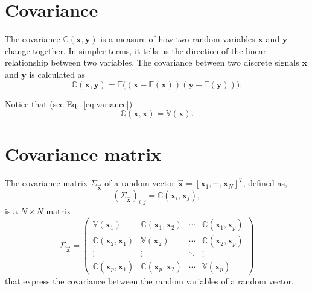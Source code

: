 
\section{Covariance}
\label{sec:covariance}

The covariance $\mathbb{C}(\mathbf{x}, \mathbf{y})$ is a measure of
how two random variables $\mathbf{x}$ and $\mathbf{y}$ change
together. In simpler terms, it tells us the direction of the linear
relationship between two variables. The covariance between two
discrete signals $\mathbf{x}$ and $\mathbf{y}$ is calculated as
\begin{equation}
  \mathbb{C}(\textbf{x}, \textbf{y}) = \mathbb{E}\big((\mathbf{x}-\mathbb{E}(\mathbf{x}))(\mathbf{y}-\mathbb{E}(\mathbf{y}))\big).
\end{equation}

Notice that (see Eq.~\ref{eq:variance})
\begin{equation}
  \mathbb{C}(\mathbf{x}, \mathbf{x}) = \mathbb{V}(\mathbf{x}).
\end{equation}


\section{Covariance matrix}
\label{sec:covariance_matrix}

The covariance matrix $\Sigma_{\overrightarrow{\mathbf{x}}}$ of a random vector $\overrightarrow{\mathbf{x}}=[\mathbf{x}_1,\cdots,\mathbf{x}_N]^T$, defined as,
\begin{equation}
  (\Sigma_{\overrightarrow{\mathbf{x}}})_{i,j}=\mathbb{C}(\mathbf{x}_i,\mathbf{x}_j),
\end{equation}
is a $N\times N$ matrix
\begin{equation}
\Sigma_{\overrightarrow{\mathbf{x}}} = 
\begin{pmatrix}
\mathbb{V}(\mathbf{x}_1) & \mathbb{C}(\mathbf{x}_1, \mathbf{x}_2) & \cdots & \mathbb{C}(\mathbf{x}_1, \mathbf{x}_p) \\
\mathbb{C}(\mathbf{x}_2, \mathbf{x}_1) & \mathbb{V}(\mathbf{x}_2) & \cdots & \mathbb{C}(\mathbf{x}_2, \mathbf{x}_p) \\
\vdots & \vdots & \ddots & \vdots \\
\mathbb{C}(\mathbf{x}_p, \mathbf{x}_1) & \mathbb{C}(\mathbf{x}_p, \mathbf{x}_2) & \cdots & \mathbb{V}(\mathbf{x}_p)
\end{pmatrix}
\end{equation}
that express the covariance between the random variables of a random vector.

